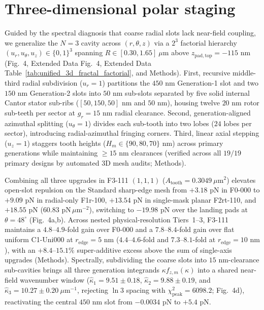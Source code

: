 \documentclass[11pt, a4paper]{article}
\begin{document}
\section*{Three-dimensional polar staging}

Guided by the spectral diagnosis that coarse radial slots lack near-field coupling, we generalize the $N=3$ cavity across $(r, \theta, z)$ via a $2^3$ factorial hierarchy $(u_r, u_\theta, u_z) \in \{0,1\}^3$ spanning $R \in [0.30, 1.65]\ \mu\text{m}$ above $z_{\mathrm{pad,top}} = -115\text{ nm}$ (Fig.~4, Extended Data Fig.~4, Extended Data Table~\ref{tab:unified_3d_fractal_factorial}, and Methods). First, recursive middle-third radial subdivision ($u_r=1$) partitions the $450\text{ nm}$ Generation-1 slot and two $150\text{ nm}$ Generation-2 slots into $50\text{ nm}$ sub-slots separated by five solid internal Cantor stator sub-ribs ($[50, 150, 50]\text{ nm}$ and $50\text{ nm}$), housing twelve $20\text{ nm}$ rotor sub-teeth per sector at $g_r = 15\text{ nm}$ radial clearance. Second, generation-aligned azimuthal splitting ($u_\theta=1$) divides each sub-tooth into two lobes ($24$ lobes per sector), introducing radial-azimuthal fringing corners. Third, linear axial stepping ($u_z=1$) staggers tooth heights ($H_m \in \{90, 80, 70\}\text{ nm}$) across primary generations while maintaining $\ge 15\text{ nm}$ clearances (verified across all $19/19$ primary designs by automated 3D mesh audits; Methods).

Combining all three upgrades in F3-111 $(1,1,1)$ ($A_{\mathrm{tooth}} = 0.3049\ \mu\text{m}^2$) elevates open-slot repulsion on the Standard sharp-edge mesh from $+3.18\text{ pN}$ in F0-000 to $+9.09\text{ pN}$ in radial-only F1r-100, $+13.54\text{ pN}$ in single-mask planar F2rt-110, and $+18.55\text{ pN}$ ($60.83\text{ pN}\,\mu\text{m}^{-2}$), switching to $-19.98\text{ pN}$ over the landing pads at $\theta=48^\circ$ (Fig.~4a,b). Across nested physical-resolution Tiers~1--3, F3-111 maintains a $4.8\text{--}4.9$-fold gain over F0-000 and a $7.8\text{--}8.4$-fold gain over flat uniform C1-Uni000 at $r_{\mathrm{edge}}=5\text{ nm}$ ($4.4\text{--}4.6$-fold and $7.3\text{--}8.1$-fold at $r_{\mathrm{edge}}=10\text{ nm}$), with an $+8.4\text{--}15.1\%$ super-additive excess above the sum of single-axis upgrades (Methods). Spectrally, subdividing the coarse slots into $15\text{ nm}$-clearance sub-cavities brings all three generation integrands $\kappa f_{z,m}(\kappa)$ into a shared near-field wavenumber window ($\hat{\kappa}_1 = 9.51 \pm 0.18$, $\hat{\kappa}_2 = 9.88 \pm 0.19$, and $\hat{\kappa}_3 = 10.27 \pm 0.20\ \mu\text{m}^{-1}$, rejecting $\ln 3$ spacing with $\chi^2_{\mathrm{peak}} = 6098.2$; Fig.~4d), reactivating the central $450\text{ nm}$ slot from $-0.0034\text{ pN}$ to $+5.4\text{ pN}$.
\end{document}
